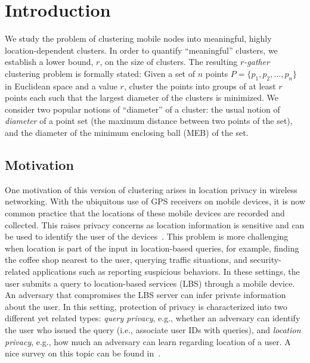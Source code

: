 

\section{Introduction}

We study the problem of clustering mobile nodes into meaningful, highly location-dependent clusters.  In order to quantify ``meaningful'' clusters, we establish a lower bound, $r$, on the size of clusters.  The resulting {\em $r$-gather} clustering problem is formally stated:
Given a set of $n$ points $P = \{p_1, p_2, \dots, p_n\}$ in Euclidean space and a value $r$, cluster the points into groups of at least $r$ points each such that the largest diameter of the clusters is minimized. We consider two popular notions of ``diameter'' of a cluster: the usual notion of {\em diameter} of a point set (the maximum distance between two points of the set), and the diameter of the minimum enclosing ball (MEB) of the set.

\subsection{Motivation}
One motivation of this version of clustering arises in location privacy in wireless networking. With the ubiquitous use of GPS receivers on mobile devices, it is now common practice that the locations of these mobile devices are recorded and collected. This raises privacy concerns as location information is sensitive and can be used to identify the user of the devices~\cite{blumberg2009}. This problem is more challenging when location is part of the input in location-based queries, for example, finding the coffee shop nearest to the user, querying traffic situations, and security-related applications such as reporting suspicious behaviors. In these settings, the user submits a query to location-based services (LBS) through a mobile device. An adversary that compromises the LBS server can infer private information about the user. In this setting, protection of privacy is characterized into two different yet related types: \emph{query privacy}, e.g., whether an adversary can identify the user who issued the query (i.e., associate user IDs with queries), and \emph{location privacy}, e.g., how much an adversary can learn regarding location of a user. %
A nice survey on this topic can be found in~\cite{Chow:2011:TPL:2031331.2031335,6155874}.

